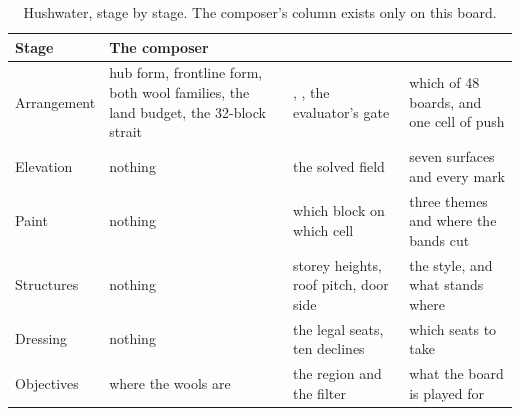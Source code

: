 \begin{table}[htbp]
\caption{Hushwater, stage by stage. The composer's column exists only on this
board.}
\label{tab:hushwater-labour}
\small
\begin{tabularx}{\textwidth}{L{2.2cm} L{4.2cm} L{4.2cm} Y}
\toprule
\textbf{Stage} & \textbf{The composer} & \textbf{} &
\textbf{} \\
\midrule
Arrangement & hub form, frontline form, both wool families, the land budget,
  the 32-block strait & , , the evaluator's gate &
  which of 48 boards, and one cell of push \\
Elevation & nothing & the solved field & seven surfaces and every mark \\
Paint & nothing & which block on which cell & three themes and where the bands
  cut \\
Structures & nothing & storey heights, roof pitch, door side & the style, and
  what stands where \\
Dressing & nothing & the legal seats, ten declines & which seats to take \\
Objectives & where the wools are & the region and the filter & what the board is
  played for \\
\bottomrule
\end{tabularx}
\end{table}
